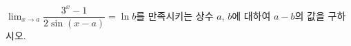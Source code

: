 $\displaystyle\lim_{x\to a}\dfrac{3^x-1}{2\sin(x-a)}=\ln b$를 만족시키는 상수 $a$, $b$에 대하여 $a-b$의 값을 구하시오. 
